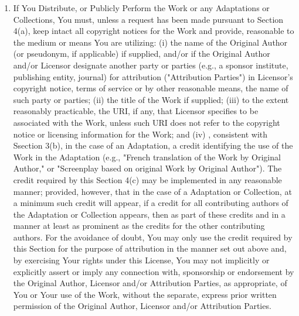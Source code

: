 \begin{enumerate}
          \item If You Distribute, or Publicly Perform the Work or
          any Adaptations or Collections, You must, unless a
          request has been made pursuant to Section 4(a), keep
          intact all copyright notices for the Work and provide,
          reasonable to the medium or means You are utilizing: (i)
          the name of the Original Author (or pseudonym, if
          applicable) if supplied, and/or if the Original Author
          and/or Licensor designate another party or parties (e.g.,
          a sponsor institute, publishing entity, journal) for
          attribution ("Attribution Parties") in Licensor's
          copyright notice, terms of service or by other reasonable
          means, the name of such party or parties; (ii) the title
          of the Work if supplied; (iii) to the extent reasonably
          practicable, the URI, if any, that Licensor specifies to
          be associated with the Work, unless such URI does not
          refer to the copyright notice or licensing information
          for the Work; and (iv) , consistent with Ssection 3(b),
          in the case of an Adaptation, a credit identifying the
          use of the Work in the Adaptation (e.g., "French
          translation of the Work by Original Author," or
          "Screenplay based on original Work by Original Author").
          The credit required by this Section 4(c) may be
          implemented in any reasonable manner; provided, however,
          that in the case of a Adaptation or Collection, at a
          minimum such credit will appear, if a credit for all
          contributing authors of the Adaptation or Collection
          appears, then as part of these credits and in a manner at
          least as prominent as the credits for the other
          contributing authors. For the avoidance of doubt, You may
          only use the credit required by this Section for the
          purpose of attribution in the manner set out above and,
          by exercising Your rights under this License, You may not
          implicitly or explicitly assert or imply any connection
          with, sponsorship or endorsement by the Original Author,
          Licensor and/or Attribution Parties, as appropriate, of
          You or Your use of the Work, without the separate,
          express prior written permission of the Original Author,
          Licensor and/or Attribution Parties.


\end{enumerate}
